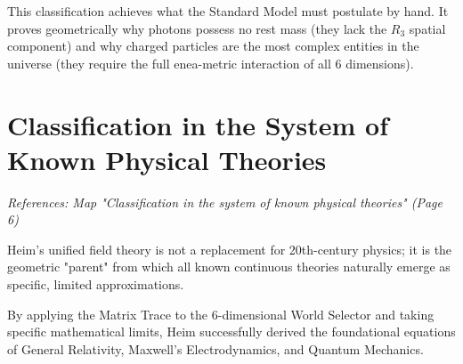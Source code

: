 \documentclass[11pt,a4paper,oneside]{article}
\begin{document}
This classification achieves what the Standard Model must postulate by hand. It proves geometrically why photons possess no rest mass (they lack the $R_3$ spatial component) and why charged particles are the most complex entities in the universe (they require the full enea-metric interaction of all 6 dimensions).

\section{Classification in the System of Known Physical Theories}
\label{sec:classification}

\textit{References: Map "Classification in the system of known physical theories" (Page 6)}

Heim's unified field theory is not a replacement for 20th-century physics; it is the geometric "parent" from which all known continuous theories naturally emerge as specific, limited approximations.

By applying the Matrix Trace to the 6-dimensional World Selector and taking specific mathematical limits, Heim successfully derived the foundational equations of General Relativity, Maxwell's Electrodynamics, and Quantum Mechanics. 
\end{document}
